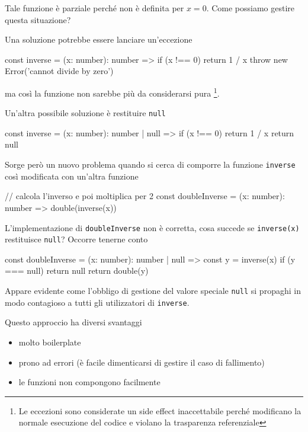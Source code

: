 \documentclass[12pt]{article}
\theoremstyle{definition}
\newenvironment{code}
  {\vspace{0.5cm} \VerbatimEnvironment\begin{typescriptcode}}
  {\end{typescriptcode} \vspace{0.2cm}}
\begin{document}
Tale funzione è parziale perché non è definita per $x = 0$. Come possiamo gestire questa situazione?

Una soluzione potrebbe essere lanciare un'eccezione

\begin{code}
const inverse = (x: number): number => {
  if (x !== 0) return 1 / x
  throw new Error('cannot divide by zero')
}
\end{code}

ma così la funzione non sarebbe più da considerarsi pura
\footnote{Le eccezioni sono considerate un side effect inaccettabile perché modificano la normale esecuzione del codice
e violano la trasparenza referenziale}.

Un'altra possibile soluzione è restituire \texttt{null}

\begin{code}
const inverse = (x: number): number | null => {
  if (x !== 0) return 1 / x
  return null
}
\end{code}

Sorge però un nuovo problema quando si cerca di comporre la funzione \texttt{inverse} così modificata con un'altra funzione

\begin{code}
// calcola l'inverso e poi moltiplica per 2
const doubleInverse = (x: number): number => double(inverse(x))
\end{code}

L'implementazione di \texttt{doubleInverse} non è corretta, cosa succede se \texttt{inverse(x)} restituisce \texttt{null}?
Occorre tenerne conto

\begin{code}
const doubleInverse = (x: number): number | null => {
  const y = inverse(x)
  if (y === null) return null
  return double(y)
}
\end{code}

Appare evidente come l'obbligo di gestione del valore speciale \texttt{null} si propaghi in modo contagioso
a tutti gli utilizzatori di \texttt{inverse}.

Questo approccio ha diversi svantaggi

\begin{itemize}
  \item molto boilerplate
  \item prono ad errori (è facile dimenticarsi di gestire il caso di fallimento)
  \item le funzioni non compongono facilmente
\end{itemize}
\end{document}
